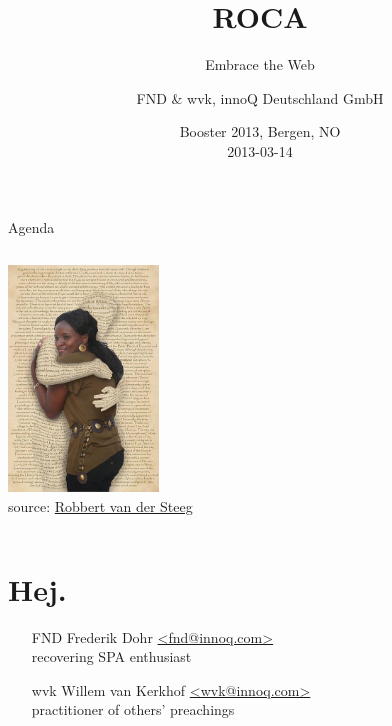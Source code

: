 \documentclass{beamer}
\date{Booster 2013, Bergen, NO \\ 2013-03-14}
\author{FND \& wvk, innoQ Deutschland GmbH}
\title{ROCA}
\subtitle{Embrace the Web}
\begin{document}
  {

  \begin{frame}[plain]
    \titlepage
  \end{frame}
}

\setcounter{tocdepth}{1}

\begin{frame}{Agenda}
  \begin{columns}
    \begin{column}{4.4cm}
      \includegraphics[width=4cm]{images/embrace.jpg}
      \\
      \tiny source: \href{http://www.flickr.com/photos/robbie73/4289385819/}{Robbert van der Steeg}
    \end{column}

    \begin{column}{6.6cm}
      \tableofcontents
    \end{column}
  \end{columns}
\end{frame}

\section{Hej.}

\begin{frame}{\insertsectionhead}
  \begin{itemize}
    \item[FND] Frederik Dohr \href{mailto:fnd@innoq.com}{<fnd@innoq.com>} \\
        recovering SPA enthusiast
    \item[]
    \item[wvk] Willem van Kerkhof \href{mailto:wvk@innoq.com}{<wvk@innoq.com>} \\
        practitioner of others' preachings
  \end{itemize}

\end{frame}
\end{document}
